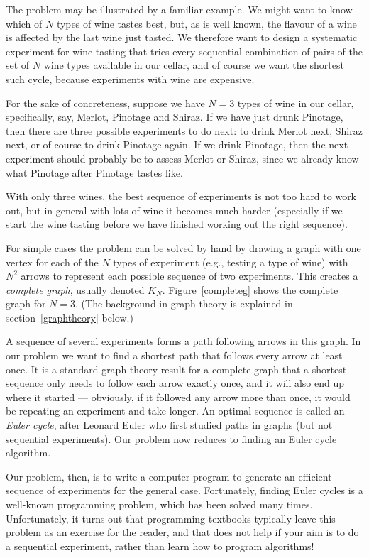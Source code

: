 \documentclass[prodmode,acmtecs]{acmsmall} %
\begin{document}
The problem may be illustrated by a familiar example. We might want to know which of $N$ types of wine tastes best, but, as is well known, the flavour of a wine is affected by the last wine just tasted. We therefore want to design a systematic experiment for wine tasting that tries every sequential combination of pairs of the set of $N$ wine types available in our cellar, and of course we want the shortest such cycle, because experiments with wine are expensive. 

For the sake of concreteness, suppose we have $N=3$ types of wine in our cellar, specifically, say, Merlot, Pinotage and Shiraz. If we have just drunk Pinotage, then there are three possible experiments to do next: to drink Merlot next, Shiraz next, or of course to drink Pinotage again. If we drink Pinotage, then the next experiment should probably be to assess Merlot or Shiraz, since we already know what Pinotage after Pinotage tastes like. 

With only three wines, the best sequence of experiments is not too hard to work out, but in general with lots of wine it becomes much harder (especially if we start the wine tasting before we have finished working out the right sequence).

For simple cases the problem can be solved by hand by drawing a graph with one vertex for each of the $N$ types of experiment (e.g., testing a type of wine) with $N^2$  arrows to represent each possible sequence of two experiments. This creates a \emph{complete graph}, usually denoted $K_N$\@. Figure~\ref{completeg} shows the complete graph for $N=3$.   (The background in graph theory is explained in section~\ref{graphtheory} below.)

A sequence of several experiments forms a path following arrows in this graph. In our problem we want to find a shortest path that follows every arrow at least once. It is a standard graph theory result for a complete graph that a shortest sequence only needs to follow each arrow exactly once, and it will also end up where it started --- obviously, if it followed any arrow more than once, it would be repeating an experiment and take longer. An optimal sequence is called an \emph{Euler cycle}, after Leonard Euler who first studied paths in graphs (but not sequential experiments). Our problem now reduces to finding an Euler cycle algorithm. 

Our problem, then, is to write a computer program to generate an efficient sequence of experiments for the general case. Fortunately, finding Euler cycles is a well-known programming problem, which has been solved many times. Unfortunately, it turns out that programming textbooks typically leave this problem as an exercise for the reader, and that does not help if your aim is to do a sequential experiment, rather than learn how to program algorithms! 
\end{document}
